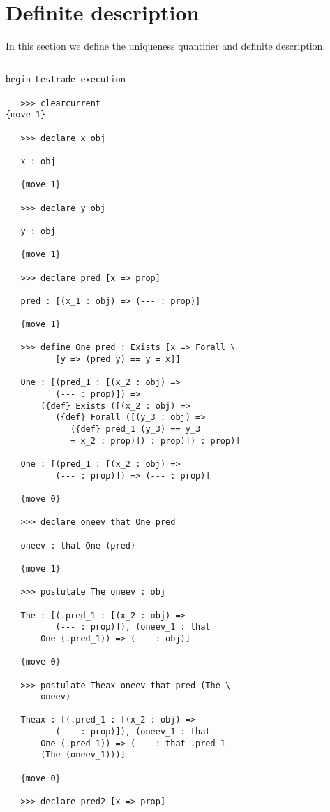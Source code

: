 \documentclass[12pt]{article}
\begin{document}
\section{Definite description}

In this section we define the uniqueness quantifier and definite description.

\begin{verbatim}

begin Lestrade execution

   >>> clearcurrent
{move 1}

   >>> declare x obj

   x : obj

   {move 1}

   >>> declare y obj

   y : obj

   {move 1}

   >>> declare pred [x => prop]

   pred : [(x_1 : obj) => (--- : prop)]

   {move 1}

   >>> define One pred : Exists [x => Forall \
          [y => (pred y) == y = x]]

   One : [(pred_1 : [(x_2 : obj) => 
          (--- : prop)]) => 
       ({def} Exists ([(x_2 : obj) => 
          ({def} Forall ([(y_3 : obj) => 
             ({def} pred_1 (y_3) == y_3 
             = x_2 : prop)]) : prop)]) : prop)]

   One : [(pred_1 : [(x_2 : obj) => 
          (--- : prop)]) => (--- : prop)]

   {move 0}

   >>> declare oneev that One pred

   oneev : that One (pred)

   {move 1}

   >>> postulate The oneev : obj

   The : [(.pred_1 : [(x_2 : obj) => 
          (--- : prop)]), (oneev_1 : that 
       One (.pred_1)) => (--- : obj)]

   {move 0}

   >>> postulate Theax oneev that pred (The \
       oneev)

   Theax : [(.pred_1 : [(x_2 : obj) => 
          (--- : prop)]), (oneev_1 : that 
       One (.pred_1)) => (--- : that .pred_1 
       (The (oneev_1)))]

   {move 0}

   >>> declare pred2 [x => prop]


\end{verbatim}
\end{document}
